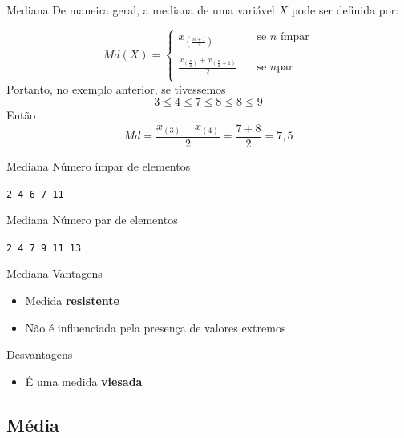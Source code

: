 \documentclass[10pt]{beamer}\usepackage[]{graphicx}\usepackage[]{color}
\theoremstyle{definition}
\begin{document}
\begin{frame}{Mediana}
  De maneira geral, a mediana de uma variável $X$ pode ser definida por:

  \[ Md(X) =
    \begin{cases}
      x_{\left(\frac{n+1}{2}\right)} & \quad \text{se } n \text{ ímpar}\\
                             & \\
      \frac{x_{\left(\frac{n}{2}\right)} +
        x_{\left(\frac{n}{2}+1\right)}}{2}  & \quad \text{se } n \text{
        par}\\
    \end{cases}
  \]
  \vspace{2em}
  Portanto, no exemplo anterior, se tívessemos
    \begin{equation*}
    3 \leq 4 \leq 7 \leq 8 \leq 8 \leq 9
  \end{equation*}
  Então
  \begin{equation*}
    Md = \frac{x_{(3)} + x_{(4)}}{2} = \frac{7 + 8}{2} = 7,5
  \end{equation*}
\end{frame}

\begin{frame}{Mediana}
  Número ímpar de elementos
\begin{center}
    \texttt{2 4 6 7 11}
  \end{center}
\end{frame}

\begin{frame}{Mediana}
  Número par de elementos
\begin{center}
    \texttt{2 4 7 9 11 13}
  \end{center}
\end{frame}

\begin{frame}{Mediana}
  Vantagens
  \begin{itemize}
  \item Medida \textbf{resistente}
  \item Não é influenciada pela presença de valores extremos
  \end{itemize}
  Desvantagens
  \begin{itemize}
  \item É uma medida \textbf{viesada}
  \end{itemize}
\end{frame}


\subsection{Média}
\end{document}
